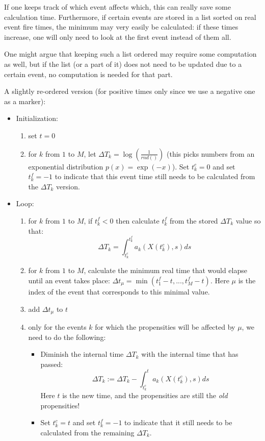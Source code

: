 \documentclass[a4paper,11pt]{article}
\begin{document}
			If one keeps track of which event affects which, this can really save some calculation time.
			Furthermore, if certain events are stored in a list sorted on real event fire times, the
			minimum may very easily be calculated: if these times increase, one will only need to look
			at the first event instead of them all.
	
			One might argue that keeping such a list ordered may require some computation as well, but
			if the list (or a part of it) does not need to be updated due to a certain event, no computation
			is needed for that part.
	
			A slightly re-ordered version (for positive times only since we use a negative one as a marker):
	
			\begin{itemize}
				\item Initialization: 
				\begin{enumerate}
					\item set $t = 0$
					\item for $k$ from $1$ to $M$, let $\Delta T_k = \log\left(\frac{1}{rnd()}\right)$ 
						(this picks numbers from an exponential distribution $p(x) = \exp(-x)$).
						Set $t^c_k = 0$ and set $t^f_k = -1$ to indicate that this
						event time still needs to be calculated from the $\Delta T_k$ version.
	
				\end{enumerate}
	
				\item Loop:
				\begin{enumerate}
					\item for $k$ from $1$ to $M$, if $t^f_k < 0$ then calculate $t^f_k$ from the
						stored $\Delta T_k$ value so that:
						\[\Delta T_k = \int_{t^c_k}^{t^f_k} a_k(X(t^c_k),s) ds \]
	
					\item for $k$ from $1$ to $M$, calculate the minimum real time that would elapse
						until an event takes place: $\Delta t_\mu = \min(t^f_1 - t, ... , t^f_M - t)$. Here $\mu$
						is the index of the event that corresponds to this minimal value.
					\item add $\Delta t_\mu$ to $t$
	
					\item only for the events $k$ for which the propensities will be affected by $\mu$, we need to do
						the following:
						\begin{itemize}
							\item Diminish the internal time $\Delta T_k$ with the internal time that has passed: 
								\[ \Delta T_k := \Delta T_k - \int_{t^c_k}^{t} a_k(X(t^c_k),s) ds \]
								Here $t$ is the new time, and the propensities are still the 
								{\em old} propensities!
							\item Set $t^c_k = t$ and set $t^f_k = -1$ to indicate that it still needs
								to be calculated from the remaining $\Delta T_k$.
						\end{itemize}
	

\end{enumerate}
\end{itemize}
\end{document}
